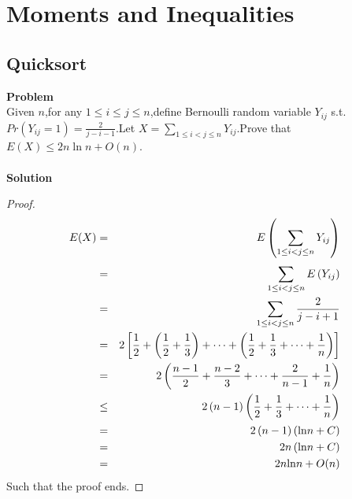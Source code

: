 \chapter{Moments and Inequalities}
\section{Quicksort}
\textbf{Problem}\\
Given $n$,for any $1 \leq i \leq j \leq n$,define Bernoulli random variable $Y_{ij}$ s.t. $Pr(Y_{ij}=1)=\frac{2}{j-i-1}$.Let $X=\sum_{1 \leq i < j \leq n}^{}Y_{ij}$.Prove that $E(X) \leq 2n \ln n+O(n)$.\\\\
\textbf{Solution}
	\begin{proof}
		\begin{eqnarray*}
		E(X)
		&=& E\left (\sum_{1 \leq i < j \leq n}^{}Y_{ij}\right)\\
		&=& \sum_{1\leq{i}<j \leq n}^{}E \left(Y_{ij}\right)\\
		&=& \sum_{1\leq{i}<j \leq n}^{}\frac{2}{j-i+1}\\
		&=& 2 \left[{\frac{1}{2} + \left(\frac{1}{2}+\frac{1}{3} \right)+\cdots+ \left(\frac{1}{2}+\frac{1}{3}+\cdots+\frac{1}{n} \right)}\right]\\
		&=& 2 \left(\frac{n-1}{2}+\frac{n-2}{3}+\cdots+\frac{2}{n-1}+\frac{1}{n} \right)\\
		&\leq & 2 \left(n-1 \right) \left(\frac{1}{2}+\frac{1}{3}+\cdots+\frac{1}{n} \right)\\
		&=& 2 \left(n-1 \right) \left({\rm ln}n+C \right)\\
		&=& 2 n \left({\rm ln}n+C \right)\\
		&=& 2 n {\rm ln}n+O(n)
	\end{eqnarray*}
Such that the proof ends.
	\end{proof}


